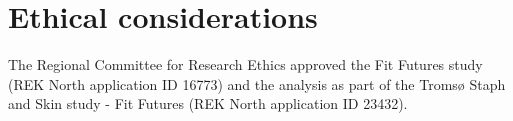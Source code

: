 \section{Ethical considerations}

The Regional Committee for Research Ethics approved the Fit Futures study (REK North application ID 16773) and the analysis as part of the Tromsø Staph and Skin study - Fit Futures (REK North application ID 23432).



			
  
 

		
